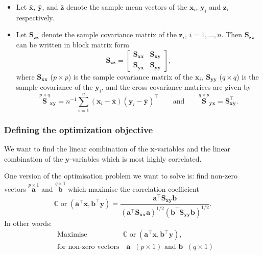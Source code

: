 \documentclass[
]{book}
\theoremstyle{definition}
\theoremstyle{definition}
\theoremstyle{definition}
\theoremstyle{definition}
\theoremstyle{remark}
\begin{document}
\begin{itemize}
\item
  Let \(\bar{\mathbf x}\), \(\bar{\mathbf y}\), and \(\bar{\mathbf z}\) denote the sample mean vectors of the \(\mathbf x_i\), \(\mathbf y_i\) and \(\mathbf z_i\) respectively.
\item
  Let \(\mathbf S_{\mathbf z\mathbf z}\) denote the sample covariance matrix of the \(\mathbf z_i\), \(i=1,\ldots, n\). Then \(\mathbf S_{\mathbf z\mathbf z}\) can be written in block matrix form
  \[
  \mathbf S_{\mathbf z\mathbf z}=\left [\begin{array}{cc}
  \mathbf S_{\mathbf x\mathbf x} & \mathbf S_{\mathbf x\mathbf y}\\
  \mathbf S_{\mathbf y\mathbf x} & \mathbf S_{\mathbf y\mathbf y} \end{array} \right ],
  \]
  where \(\mathbf S_{\mathbf x\mathbf x}\) (\(p \times p\)) is the sample covariance matrix of the \(\mathbf x_i\), \(\mathbf S_{\mathbf y\mathbf y}\) (\(q \times q\)) is the sample covariance of the \(\mathbf y_i\), and the cross-covariance matrices are given by
  \[
  \stackrel{p \times q}{\mathbf S}_{\mathbf x\mathbf y}=n^{-1} \sum_{i=1}^n (\mathbf x_i -\bar{\mathbf x})(\mathbf y_i-\bar{\mathbf y})^\top
  \qquad \text{and} \qquad \stackrel{q \times p}{\mathbf S}_{\mathbf y\mathbf x}=\mathbf S_{\mathbf x\mathbf y}^\top.
  \]
\end{itemize}

\hypertarget{defining-the-optimization-objective}{%
\subsubsection*{Defining the optimization objective}\label{defining-the-optimization-objective}}

We want to find the linear combination of the \(\mathbf x\)-variables and the linear combination of the \(\mathbf y\)-variables which is most highly correlated.

One version of the optimisation problem we want to solve is: find non-zero vectors \(\stackrel{p \times 1}{\mathbf a}\) and \(\stackrel{q \times 1}{\mathbf b}\) which maximise the correlation coefficient
\[
{\mathbb{C}\operatorname{or}}(\mathbf a^\top \mathbf x,\mathbf b^\top \mathbf y)=\frac{\mathbf a^\top \mathbf S_{\mathbf x\mathbf y}\mathbf b}{(\mathbf a^\top \mathbf S_{\mathbf x\mathbf x}\mathbf a)^{1/2}(\mathbf b^\top \mathbf S_{\mathbf y\mathbf y}\mathbf b)^{1/2}}.
\]
In other words:
\begin{align}
&\mbox{Maximise} \qquad\qquad \quad  {\mathbb{C}\operatorname{or}}(\mathbf a^\top \mathbf x,\mathbf b^\top \mathbf y),
\label{eq:opt26}\\
  &\mbox{for non-zero vectors}\quad  \mathbf a\;\; (p \times 1)\mbox{ and  } \mathbf b\;\; (q \times 1) \nonumber
\end{align}
\end{document}
